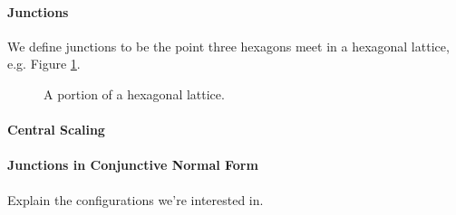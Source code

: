 \paragraph{Junctions}
We define junctions to be the point three hexagons meet in a hexagonal lattice,
e.g. Figure \ref{fig:lattice}.
\newdimen\R
\R=4.5cm
\begin{figure}[h] 
\begin{center}
\caption{A portion of a hexagonal lattice.}
\label{fig:lattice}
\end{center}
\end{figure}
\newpage
\paragraph{Central Scaling}
\paragraph{Junctions in Conjunctive Normal Form}
Explain the configurations we're interested in.
